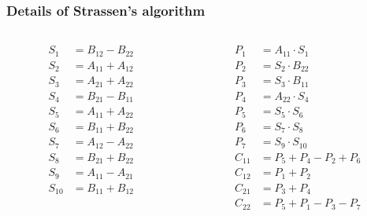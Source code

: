 \documentclass{beamer}
\begin{document}
\begin{frame} \frametitle{Details of Strassen's algorithm}
  \begin{columns}
  \begin{column}{0.5\textwidth}
    \begin{align*}
      S_1    &= B_{12} - B_{22} \\
      S_2    &= A_{11} + A_{12} \\
      S_3    &= A_{21} + A_{22} \\
      S_4    &= B_{21} - B_{11} \\
      S_5    &= A_{11} + A_{22} \\
      S_6    &= B_{11} + B_{22} \\
      S_7    &= A_{12} - A_{22} \\
      S_8    &= B_{21} + B_{22} \\
      S_9    &= A_{11} - A_{21} \\
      S_{10} &= B_{11} + B_{12} \\
    \end{align*}
  \end{column}
  \begin{column}{0.5\textwidth}
    \begin{align*}
      P_1 &= A_{11} \cdot S_1 \\
      P_2 &= S_2 \cdot B_{22} \\
      P_3 &= S_3 \cdot B_{11} \\
      P_4 &= A_{22} \cdot S_4 \\
      P_5 &= S_5 \cdot S_6 \\
      P_6 &= S_7 \cdot S_8 \\
      P_7 &= S_9 \cdot S_{10} \\
      C_{11} &= P_5 + P_4 - P_2 + P_6 \\
      C_{12} &= P_1 + P_2 \\
      C_{21} &= P_3 + P_4 \\
      C_{22} &= P_5 + P_1 - P_3 - P_7 \\
    \end{align*}
  \end{column}
 \end{columns}
\end{frame}
\end{document}
